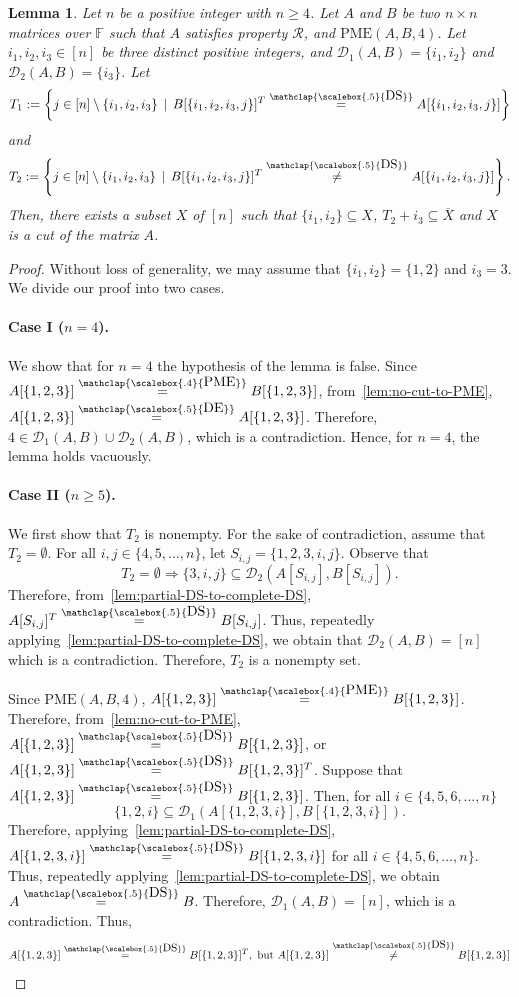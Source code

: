 \documentclass[11pt,letterpaper]{article}
\newcommand{\comp}[1]{\overline{#1}}
\newcommand{\F}{\mathbb{F}}
\newtheorem{lemma}{Lemma}[section]
\newcommand{\DS}{\stackrel{\mathclap{\scalebox{.5}{\mbox{DS}}}}{=}}
\newcommand{\nDS}{\stackrel{\mathclap{\scalebox{.5}{\mbox{DS}}}}{\neq}}
\newcommand{\DE}{\stackrel{\mathclap{\scalebox{.5}{\mbox{DE}}}}{=}}
\newcommand{\PME}{\stackrel{\mathclap{\scalebox{.4}{\mbox{PME}}}}{=}}
\newcommand{\kPME}[3]{\mathrm{PME}(#1, #2, #3)}
\newcommand{\calD}{\mathcal{D}}
\newcommand{\prop}{\mathcal{R}}
\begin{document}
{{{\begin{lemma}
\label{lem:small-matrices-DE-to-cut-3}
Let $n$ be a positive integer with $n\geq 4$. Let $A$ and $B$ be two $n\times n$ matrices over $\F$ such that $A$ satisfies property $\prop$, and $\kPME{A}{B}{4}$. Let $i_1, i_2, i_3\in[n]$ be three distinct positive integers, and $\calD_1(A,B)=\{i_1, i_2\}$ and $\calD_2(A,B)=\{i_3\}$. Let $$T_1:=\left\{j\in[n]\setminus\{i_1, i_2, i_3\}\,\mid\, B[\{i_1, i_2, i_3, j\}]^T\DS A[\{i_1, i_2, i_3, j\}]\right\}$$ and $$T_2:=\left\{j\in[n]\setminus\{i_1, i_2, i_3\}\,\mid\, B[\{i_1, i_2, i_3, j\}]^T \nDS A[\{i_1, i_2, i_3, j\}]\right\}.$$ Then, there exists a subset $X$ of $[n]$ such that $\{i_1, i_2\}\subseteq X$, $T_2+i_3\subseteq \comp{X}$ and $X$ is a cut of the matrix $A$.  
\end{lemma}
\begin{proof}
Without loss of generality, we may assume that $\{i_1,i_2\}=\{1,2\}$ and $i_3=3$. We divide our proof into two cases.

\paragraph*{Case I ($n=4$).} We show that for $n=4$ the hypothesis of the lemma is false. Since $A[\{1,2,3\}]\PME B[\{1,2,3\}]$, from~\cref{lem:no-cut-to-PME}, $A[\{1,2,3\}]\DE A[\{1,2,3\}]$. Therefore, $4\in \calD_1(A, B)\cup \calD_2(A,B)$, which is a contradiction. Hence, for $n=4$, the lemma holds vacuously.


\paragraph*{Case II ($n\geq 5$).} We first show that $T_2$ is nonempty. For the sake of contradiction, assume that $T_2=\emptyset$. For all $i,j\in\{4,5,\ldots, n\}$, let $S_{i,j}=\{1,2,3,i,j\}$. Observe that $$T_2=\emptyset\Longrightarrow \{3,i,j\}\subseteq \calD_2(A[S_{i,j}], B[S_{i,j}]).$$ Therefore, from~\cref{lem:partial-DS-to-complete-DS}, $A[S_{i,j}]^T\DS B[S_{i,j}]$. Thus, repeatedly applying~\cref{lem:partial-DS-to-complete-DS}, we obtain that $\calD_2(A, B)=[n]$ which is a contradiction. Therefore, $T_2$ is a nonempty set.



Since $\kPME{A}{B}{4}$, $A[\{1,2,3\}]\PME B[\{1,2,3\}]$. Therefore, from~\cref{lem:no-cut-to-PME}, $A[\{1,2,3\}]\DS B[\{1,2,3\}]$, or $A[\{1,2,3\}]\DS B[\{1,2,3\}]^T$. Suppose that $A[\{1,2,3\}]\DS B[\{1,2,3\}]$. Then, for all $i\in\{4,5,6, \ldots, n\}$ $$\{1,2,i\}\subseteq \calD_1(A[\{1,2,3,i\}], B[\{1,2,3,i\}]).$$ Therefore, applying~\cref{lem:partial-DS-to-complete-DS}, $A[\{1,2,3,i\}]\DS B[\{1,2,3,i\}]$ for all $i\in\{4,5,6,\ldots, n\}$. Thus, repeatedly applying~\cref{lem:partial-DS-to-complete-DS}, we obtain $A\DS B$. Therefore, $\calD_1(A,B)=[n]$, which is a contradiction. Thus, 
\begin{equation}
\label{eqn:small-matrices-DE-to-cut-3-one}
A[\{1,2,3\}]\DS B[\{1,2,3\}]^T, \text{ but }A[\{1,2,3\}]\nDS B[\{1,2,3\}]
\end{equation}






\end{proof}}}}
\end{document}
